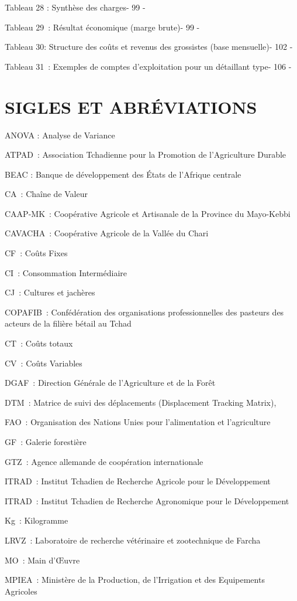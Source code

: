 \documentclass[12pt,oneside]{report}
\begin{document}
Tableau 28 : Synthèse des charges- 99 -

Tableau 29 : Résultat économique (marge brute)- 99 -

Tableau 30: Structure des coûts et revenus des grossistes (base mensuelle)- 102 -

Tableau 31 : Exemples de comptes d’exploitation pour un détaillant type- 106 -

\chapter{SIGLES ET ABRÉVIATIONS}
ANOVA : Analyse de Variance

ATPAD : Association Tchadienne pour la Promotion de l'Agriculture Durable

BEAC : Banque de développement des États de l'Afrique centrale

CA : Chaîne de Valeur

CAAP-MK : Coopérative Agricole et Artisanale de la Province du Mayo-Kebbi

CAVACHA : Coopérative Agricole de la Vallée du Chari

CF : Coûts Fixes

CI : Consommation Intermédiaire

CJ : Cultures et jachères

COPAFIB : Confédération des organisations professionnelles des pasteurs des acteurs de la filière bétail au Tchad

CT : Coûts totaux

CV : Coûts Variables

DGAF : Direction Générale de l'Agriculture et de la Forêt

DTM : Matrice de suivi des déplacements (Displacement Tracking Matrix),

FAO : Organisation des Nations Unies pour l'alimentation et l'agriculture

GF : Galerie forestière

GTZ : Agence allemande de coopération internationale

ITRAD : Institut Tchadien de Recherche Agricole pour le Développement

ITRAD : Institut Tchadien de Recherche Agronomique pour le Développement

Kg : Kilogramme

LRVZ : Laboratoire de recherche vétérinaire et zootechnique de Farcha

MO : Main d’Œuvre

MPIEA : Ministère de la Production, de l'Irrigation et des Equipements Agricoles
\end{document}
